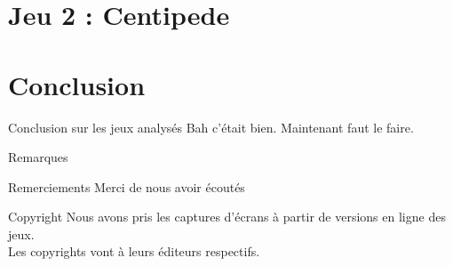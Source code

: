 \documentclass{beamer}
\begin{document}
\section{Jeu 2 : Centipede}


\section{Conclusion}
\begin{frame}{Conclusion sur les jeux analysés}
	Bah c'était bien. Maintenant faut le faire.
\end{frame}
\begin{frame}{Remarques}
	\begin{block}{Remerciements}
		Merci de nous avoir écoutés
	\end{block}
	\begin{block}{Copyright}
		Nous avons pris les captures d'écrans à partir de versions en ligne des jeux.\\Les copyrights vont à leurs éditeurs respectifs.
	\end{block}
\end{frame}
\end{document}
